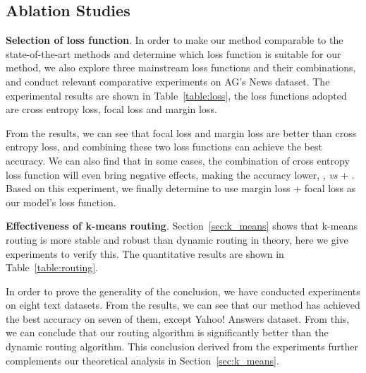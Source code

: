 \documentclass[times,twocolumn,final]{elsarticle}
\begin{document}
\subsection{Ablation Studies}
\label{sec:ablation}

\textbf{Selection of loss function}. In order to make our method comparable to the state-of-the-art methods and determine which loss function is suitable for our method, we also explore three mainstream loss functions and their combinations, and conduct relevant comparative experiments on AG's News dataset. The experimental results are shown in Table~\ref{table:loss}, the loss functions adopted are cross entropy loss, focal loss and margin loss.

From the results, we can see that focal loss and margin loss are better than cross entropy loss, and combining these two loss functions can achieve the best accuracy. We can also find that in some cases, the combination of cross entropy loss function will even bring negative effects, making the accuracy lower, \eg,  \textit{vs}  + . Based on this experiment, we finally determine to use margin loss + focal loss as our model's loss function.

\begin{table}
  \centering
  \caption{Ablation studies for routing algorithms on eight text classification datasets. The best test accuracy (\%) are bold.}
  \label{table:routing}
\end{table}

\noindent\textbf{Effectiveness of k-means routing}. Section~\ref{sec:k_means} shows that k-means routing is more stable and robust than dynamic routing in theory, here we give experiments to verify this. The quantitative results are shown in Table~\ref{table:routing}. 

In order to prove the generality of the conclusion, we have conducted experiments on eight text datasets. From the results, we can see that our method has achieved the best accuracy on seven of them, except Yahoo! Answers dataset. From this, we can conclude that our routing algorithm is significantly better than the dynamic routing algorithm. This conclusion derived from the experiments further complements our theoretical analysis in Section~\ref{sec:k_means}.
\end{document}
